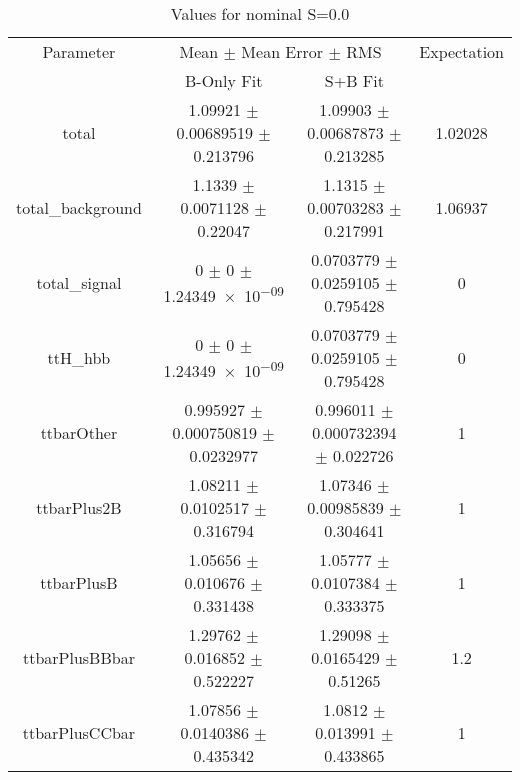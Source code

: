 \begin{table}
\centering
\caption{Values for nominal S=0.0}
\begin{tabular}{cccc}
\toprule
Parameter & \multicolumn{2}{c}{Mean $\pm$ Mean Error $\pm$ RMS} & Expectation\\
 & B-Only Fit & S+B Fit & \\
\midrule
total & \num{1.09921} $\pm$ \num{0.00689519} $\pm$ \num{0.213796} & \num{1.09903} $\pm$ \num{0.00687873} $\pm$ \num{0.213285} & \num{1.02028}\\
total\_background & \num{1.1339} $\pm$ \num{0.0071128} $\pm$ \num{0.22047} & \num{1.1315} $\pm$ \num{0.00703283} $\pm$ \num{0.217991} & \num{1.06937}\\
total\_signal & \num{0} $\pm$ \num{0} $\pm$ \num{1.24349e-09} & \num{0.0703779} $\pm$ \num{0.0259105} $\pm$ \num{0.795428} & \num{0}\\
ttH\_hbb & \num{0} $\pm$ \num{0} $\pm$ \num{1.24349e-09} & \num{0.0703779} $\pm$ \num{0.0259105} $\pm$ \num{0.795428} & \num{0}\\
ttbarOther & \num{0.995927} $\pm$ \num{0.000750819} $\pm$ \num{0.0232977} & \num{0.996011} $\pm$ \num{0.000732394} $\pm$ \num{0.022726} & \num{1}\\
ttbarPlus2B & \num{1.08211} $\pm$ \num{0.0102517} $\pm$ \num{0.316794} & \num{1.07346} $\pm$ \num{0.00985839} $\pm$ \num{0.304641} & \num{1}\\
ttbarPlusB & \num{1.05656} $\pm$ \num{0.010676} $\pm$ \num{0.331438} & \num{1.05777} $\pm$ \num{0.0107384} $\pm$ \num{0.333375} & \num{1}\\
ttbarPlusBBbar & \num{1.29762} $\pm$ \num{0.016852} $\pm$ \num{0.522227} & \num{1.29098} $\pm$ \num{0.0165429} $\pm$ \num{0.51265} & \num{1.2}\\
ttbarPlusCCbar & \num{1.07856} $\pm$ \num{0.0140386} $\pm$ \num{0.435342} & \num{1.0812} $\pm$ \num{0.013991} $\pm$ \num{0.433865} & \num{1}\\
\bottomrule
\end{tabular}
\end{table}